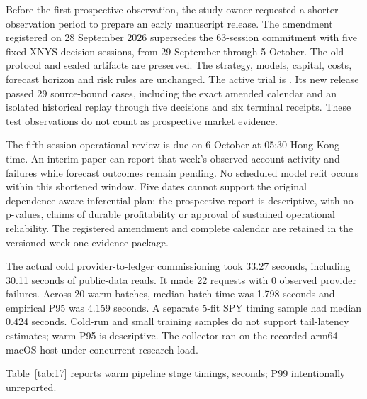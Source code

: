 \documentclass[11pt,a4paper]{article}
\begin{document}
Before the first prospective observation, the study owner requested a shorter observation period to prepare an early manuscript release. The amendment registered on 28 September 2026 supersedes the 63-session commitment with five fixed XNYS decision sessions, from 29 September through 5 October. The old protocol and sealed artifacts are preserved. The strategy, models, capital, costs, forecast horizon and risk rules are unchanged. The active trial is . Its new release passed 29 source-bound cases, including the exact amended calendar and an isolated historical replay through five decisions and six terminal receipts. These test observations do not count as prospective market evidence.

The fifth-session operational review is due on 6 October at 05:30 Hong Kong time. An interim paper can report that week's observed account activity and failures while forecast outcomes remain pending. No scheduled model refit occurs within this shortened window. Five dates cannot support the original dependence-aware inferential plan: the prospective report is descriptive, with no p-values, claims of durable profitability or approval of sustained operational reliability. The registered amendment and complete calendar are retained in the versioned week-one evidence package.

The actual cold provider-to-ledger commissioning took 33.27 seconds, including 30.11 seconds of public-data reads. It made 22 requests with 0 observed provider failures. Across 20 warm batches, median batch time was 1.798 seconds and empirical P95 was 4.159 seconds. A separate 5-fit SPY timing sample had median 0.424 seconds. Cold-run and small training samples do not support tail-latency estimates; warm P95 is descriptive. The collector ran on the recorded arm64 macOS host under concurrent research load.

\noindent Table~\ref{tab:17} reports warm pipeline stage timings, seconds; P99 intentionally unreported.
\end{document}
